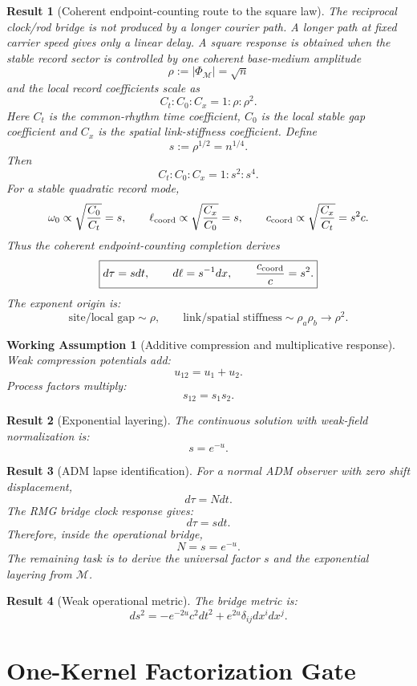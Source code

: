 \documentclass[11pt]{article}
\newtheorem{assumption}{Working Assumption}
\newtheorem{result}{Result}
\begin{document}
\begin{result}[Coherent endpoint-counting route to the square law]
The reciprocal clock/rod bridge is not produced by a longer courier path.  A
longer path at fixed carrier speed gives only a linear delay.  A square response
is obtained when the stable record sector is controlled by one coherent
base-medium amplitude
\[
\boxed{
\rho:=|\Phi_{\mathcal M}|=\sqrt n
}
\]
and the local record coefficients scale as
\[
\boxed{
C_t:C_0:C_x=1:\rho:\rho^2.
}
\]
Here \(C_t\) is the common-rhythm time coefficient, \(C_0\) is the local stable
gap coefficient and \(C_x\) is the spatial link-stiffness coefficient.  Define
\[
\boxed{
s:=\rho^{1/2}=n^{1/4}.
}
\]
Then
\[
C_t:C_0:C_x=1:s^2:s^4.
\]
For a stable quadratic record mode,
\[
\omega_0\propto\sqrt{\frac{C_0}{C_t}}=s,
\qquad
\ell_{\rm coord}\propto\sqrt{\frac{C_x}{C_0}}=s,
\qquad
c_{\rm coord}\propto\sqrt{\frac{C_x}{C_t}}=s^2c.
\]
Thus the coherent endpoint-counting completion derives
\[
\boxed{
d\tau=sdt,\qquad d\ell=s^{-1}dx,\qquad \frac{c_{\rm coord}}{c}=s^2.
}
\]
The exponent origin is:
\[
\boxed{
\text{site/local gap} \sim \rho,
\qquad
\text{link/spatial stiffness} \sim \rho_a\rho_b\to\rho^2.
}
\]
\end{result}

\begin{assumption}[Additive compression and multiplicative response]
Weak compression potentials add:
\[
u_{12}=u_1+u_2.
\]
Process factors multiply:
\[
s_{12}=s_1s_2.
\]
\end{assumption}

\begin{result}[Exponential layering]
The continuous solution with weak-field normalization is:
\[
\boxed{
s=e^{-u}.
}
\]
\end{result}

\begin{result}[ADM lapse identification]
For a normal ADM observer with zero shift displacement,
\[
d\tau=Ndt.
\]
The RMG bridge clock response gives:
\[
d\tau=sdt.
\]
Therefore, inside the operational bridge,
\[
\boxed{
N=s=e^{-u}.
}
\]
The remaining task is to derive the universal factor \(s\) and the
exponential layering from \(\mathcal M\).
\end{result}

\begin{result}[Weak operational metric]
The bridge metric is:
\[
\boxed{
ds^2=-e^{-2u}c^2dt^2+e^{2u}\delta_{ij}dx^idx^j.
}
\]
\end{result}

\section{One-Kernel Factorization Gate}
\end{document}
